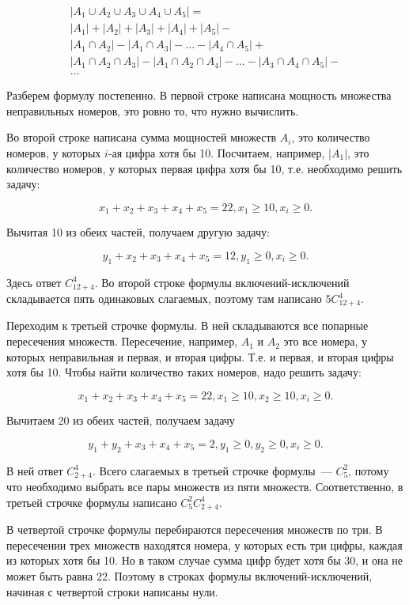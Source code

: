 \documentclass{article}
\begin{document}
$$
\begin{gathered}
|A_1\cup A_2\cup A_3\cup A_4\cup A_5|=\\
|A_1|+|A_2|+|A_3|+|A_4|+|A_5|-\\
|A_1\cap A_2|-|A_1\cap A_3|-\ldots-|A_4\cap A_5|+\\
|A_1\cap A_2 \cap A_3|-|A_1\cap A_2\cap A_4|-\ldots-|A_3\cap A_4\cap A_5|-\\
\ldots
\end{gathered}
$$

Разберем формулу постепенно. В первой строке написана мощность множества неправильных номеров, это ровно то, что нужно вычислить.

Во второй строке написана сумма мощностей множеств $A_i$, это количество номеров, у которых $i$-ая цифра хотя бы 10. Посчитаем, например, $|A_1|$, это количество номеров, у которых первая цифра хотя бы 10, т.е. необходимо решить задачу:

$$x_1+x_2+x_3+x_4+x_5=22, x_1\ge10, x_i\ge 0.$$

Вычитая 10 из обеих частей, получаем другую задачу:

$$y_1+x_2+x_3+x_4+x_5=12, y_1\ge0, x_i\ge 0.$$

Здесь ответ $C_{12+4}^4$. Во второй строке формулы включений-исключений складывается пять одинаковых слагаемых, поэтому там написано $5C_{12+4}^4$.

Переходим к третьей строчке формулы. В ней складываются все попарные пересечения множеств. Пересечение, например, $A_1$ и $A_2$ это все номера, у которых неправильная и первая, и вторая цифры. Т.е. и первая, и вторая цифры хотя бы 10. Чтобы найти количество таких номеров, надо решить задачу:

$$x_1+x_2+x_3+x_4+x_5=22, x_1\ge10, x_2\ge10, x_i\ge 0.$$

Вычитаем 20 из обеих частей, получаем задачу 

$$y_1+y_2+x_3+x_4+x_5=2, y_1\ge0, y_2\ge0, x_i\ge 0.$$

В ней ответ $C_{2 + 4}^4$. Всего слагаемых в третьей строчке формулы~--- $C_5^2$, потому что необходимо выбрать все пары множеств из пяти множеств. Соответственно, в третьей строчке формулы написано $C_5^2C_{2 + 4}^4$.

В четвертой строчке формулы перебираются пересечения множеств по три. В пересечении трех множеств находятся номера, у которых есть три цифры, каждая из которых хотя бы 10. Но в таком случае сумма цифр будет хотя бы 30, и она не может быть равна 22. Поэтому в строках формулы включений-исключений, начиная с четвертой строки написаны нули.
\end{document}
